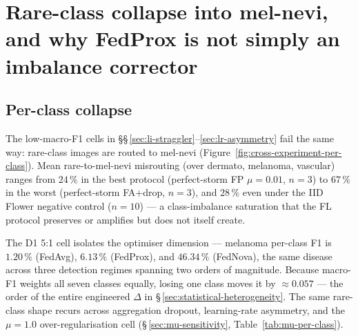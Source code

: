 \documentclass[11pt,a4paper]{report}
\begin{document}


\section{Rare-class collapse into mel-nevi, and why FedProx is not simply
an imbalance corrector}
\label{sec:rare-class-collapse}


\subsection{Per-class collapse}

The low-macro-F1 cells in \S\S\,\ref{sec:li-straggler}--\ref{sec:lr-asymmetry}
fail the same way: rare-class images are routed to mel-nevi
(Figure~\ref{fig:cross-experiment-per-class}). Mean rare-to-mel-nevi
misrouting (over dermato, melanoma, vascular) ranges from $24\,\%$ in the
best protocol (perfect-storm FP $\mu = 0.01$, $n=3$) to $67\,\%$ in the
worst (perfect-storm FA+drop, $n=3$), and $28\,\%$ even under the IID
Flower negative control ($n=10$) --- a class-imbalance saturation that the
FL protocol preserves or amplifies but does not itself create.

The D1 5:1 cell isolates the optimiser dimension --- melanoma per-class F1 is
$1.20\,\%$ (FedAvg), $6.13\,\%$ (FedProx), and $46.34\,\%$ (FedNova), the same
disease across three detection regimes spanning two orders of magnitude. Because
macro-F1 weights all seven classes equally, losing one class moves it by
$\approx 0.057$ --- the order of the entire engineered $\Delta$ in
\S\,\ref{sec:statistical-heterogeneity}. The same rare-class shape recurs across
aggregation dropout, learning-rate asymmetry, and the $\mu = 1.0$
over-regularisation cell (\S\,\ref{sec:mu-sensitivity}, Table~\ref{tab:mu-per-class}).
\end{document}
